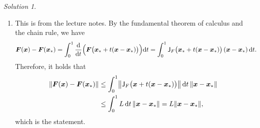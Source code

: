 \documentclass[11pt]{article}
\theoremstyle{definition}
\theoremstyle{remark}
\newtheorem*{solution}{Solution}
\begin{document}
\begin{solution}
\begin{enumerate}
        \item
            This is from the lecture notes.
            By the fundamental theorem of calculus and the chain rule,
            we have
            \begin{align*}
                \mathbf{\boldsymbol{F}}(\mathbf{\boldsymbol{x}}) - \mathbf{\boldsymbol{F}}(\mathbf{\boldsymbol{x}}_*)
                &= \int_{0}^{1} \frac{\mathrm d}{\mathrm d t} \Bigl( \mathbf{\boldsymbol{F}}\bigl(\mathbf{\boldsymbol{x}}_* + t(\mathbf{\boldsymbol{x}} - \mathbf{\boldsymbol{x}}_*) \bigr) \Bigr) \mathrm d t
                = \int_{0}^{1} \mathsf J_F\bigl(\mathbf{\boldsymbol{x}}_* + t(\mathbf{\boldsymbol{x}} - \mathbf{\boldsymbol{x}}_*)\bigr) \left(\mathbf{\boldsymbol{x}} - \mathbf{\boldsymbol{x}}_* \right) \mathrm d t.
            \end{align*}
            Therefore,
            it holds that
            \begin{align*}
                \norm{\vect F(\vect x) - \vect F(\vect x_*)}
                &\leq \int_{0}^{1} \norm*{\mat J_F\bigl(\vect x + t(\vect x - \vect x_*)\bigr)}  \, \d t \, \norm{\vect x - \vect x_*} \\
                &\leq \int_{0}^{1} L \, \d t \, \norm{\vect x - \vect x_*} = L \norm{\vect x - \vect x_*},
            \end{align*}
            which is the statement.
    \end{enumerate}
\end{solution}
\end{document}
